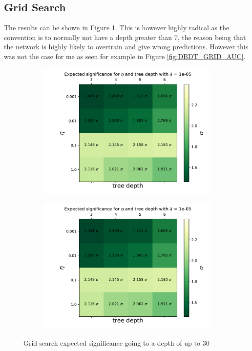 \documentclass[14pt, a4paper]{book}
\begin{document}
\subsection{Grid Search}\label{sec:BDTGriddy_res}
The results can be shown in Figure \ref{fig:BDT_deep_sig}. This is however highly radical as the convention is to normally not have a depth greater than 7, 
the reason being that the network is highly likely to overtrain and give wrong predictions. However this was not the case for me as seen for example in Figure \ref{fig:DBDT_GRID_AUC}.
\graphicspath{{../../../Plots/XGBoost/FULL/GRIDSEARCH_3-6}}
\begin{figure}[!ht]
	\centering
	\begin{subfigure}[b]{0.49\textwidth}
      \centering
      \includegraphics[width=1\textwidth]{Expected_significance.pdf}
   \end{subfigure}
   \hfill\graphicspath{{../../../Plots/XGBoost/FULL/GRIDSEARCH_24-30}}
   \begin{subfigure}[b]{0.49\textwidth}
      \centering
      \includegraphics[width=1\textwidth]{Expected_significance.pdf}
   \end{subfigure}
   \caption{Grid search expected significance going to a depth of up to 30}\label{fig:BDT_deep_sig}
\end{figure}
\end{document}

